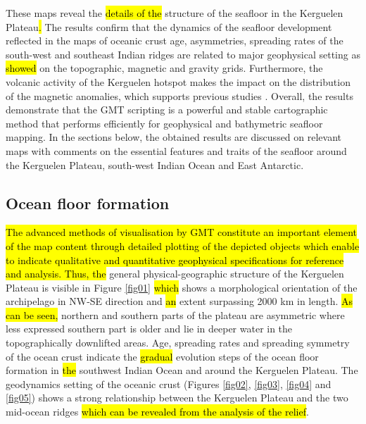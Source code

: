\documentclass[geomatics,article,submit,pdftex,moreauthors]{Definitions/mdpi}
\begin{document}
These maps reveal the \hl{details of the }structure of the seafloor in the Kerguelen Plateau\hl{. }The results confirm that the dynamics of the seafloor development reflected in the maps of oceanic crust age, asymmetries, spreading rates of the south-west and southeast Indian ridges are related to major geophysical setting as \hl{showed} on the topographic, magnetic and gravity grids. Furthermore, the volcanic activity of the Kerguelen hotspot makes the impact on the distribution of the magnetic anomalies, which supports\hl{ }previous studies \cite{Fanjat,Weissel,Jokat}. Overall, the results demonstrate that the GMT scripting is a powerful and stable cartographic method that performs efficiently for geophysical and bathymetric seafloor mapping. In the sections below, the obtained results are discussed on relevant maps with\hl{ }comments on the essential features and traits of the seafloor around the Kerguelen Plateau, south-west Indian Ocean and\hl{ }East Antarctic. 

\subsection{Ocean floor formation}

\hl{The advanced methods of visualisation by GMT constitute an important element of the map content through detailed plotting of the depicted objects which enable to indicate qualitative and quantitative geophysical specifications for reference and analysis. Thus, the }general physical-geographic structure of the Kerguelen Plateau is visible in\hl{ }Figure \ref{fig01} \hl{which }shows a morphological orientation of the archipelago in\hl{ }NW-SE direction and \hl{an} extent surpassing 2000 km in length. \hl{As can be seen, }northern and southern parts of the plateau are asymmetric where less expressed southern part is older and lie in deeper water in the topographically downlifted areas. Age, spreading rates and spreading symmetry of the ocean crust indicate the \hl{gradual }evolution steps of the ocean floor formation in \hl{the }southwest Indian Ocean and around the Kerguelen Plateau. The geodynamics setting of the oceanic crust (Figures \ref{fig02}, \ref{fig03}, \ref{fig04} and \ref{fig05}) shows a strong relationship between the Kerguelen Plateau and the two mid-ocean ridges \hl{which can be revealed from the analysis of the relief}.
\end{document}
